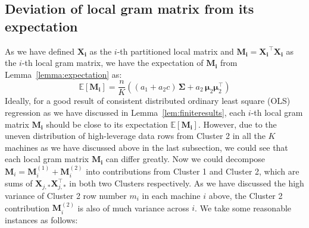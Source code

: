 \documentclass[11pt]{article}
\numberwithin{equation}{section}
\theoremstyle{plain}
\theoremstyle{definition}
\theoremstyle{remark}
\begin{document}
\subsection{Deviation of local gram matrix from its expectation}
As we have defined $\mathbf{X_{i}}$ as the $i$-th partitioned local matrix and 
$\mathbf{M_{i}} = \mathbf{X_{i}}^{\top}\mathbf{X_{i}}$ as
the $i$-th local gram matrix, we have the expectation of $\mathbf{M_{i}}$ from Lemma~\ref{lemma:expectation} as:
\[
  \mathbb{E}[\mathbf{M_{i}}] = \frac{n}{K}\left((a_{1}+a_{2}c)\,\mathbf{\Sigma} + a_{2}\,\boldsymbol{\mu}_{2}\boldsymbol{\mu}_{2}^{\!\top}\right)
\]
Ideally, for a good result of consistent distributed ordinary least square (OLS) regression as we have discussed in Lemma~\ref{lem:finiteresults}, each $i$-th local gram matrix $\mathbf{M_{i}}$ should be close to its expectation $\mathbb{E}[\mathbf{M_{i}}]$.
However, due to the uneven distribution of high-leverage data rows from Cluster 2 in all the $K$ machines as we have discussed above in the last subsection, we could see that each local gram matrix $\mathbf{M_{i}}$ can differ greatly.
Now we could decompose $\mathbf{M}_{i} = \mathbf{M}_{i}^{(1)} + \mathbf{M}_{i}^{(2)}$ 
into contributions from Cluster 1 and Cluster 2, which
are sums of $\mathbf{X}_{j,\ast}\mathbf{X}_{j,\ast}^{\top}$
in both two Clusters respectively.
As we have discussed the high variance of Cluster 2 row number $m_{i}$ in each machine $i$ above,
the Cluster 2 contribution $\mathbf{M}_{i}^{(2)}$ is also of much variance across $i$. We take some reasonable instances as follows:
\end{document}
